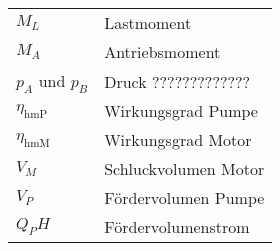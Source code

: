 
\begin{tabular}{ll}
$M_L$ & Lastmoment \\
$M_A$ & Antriebsmoment \\
$p_A$ und $p_B$ & Druck ????????????? \\
$\eta_{ \text{hmP} }$ & Wirkungsgrad Pumpe \\
$\eta_{ \text{hmM} }$ & Wirkungsgrad Motor \\
$ V_M $ & Schluckvolumen Motor \\
$ V_P $ & Fördervolumen Pumpe \\
$Q_PH $ & Fördervolumenstrom
\end{tabular}


\vfill
